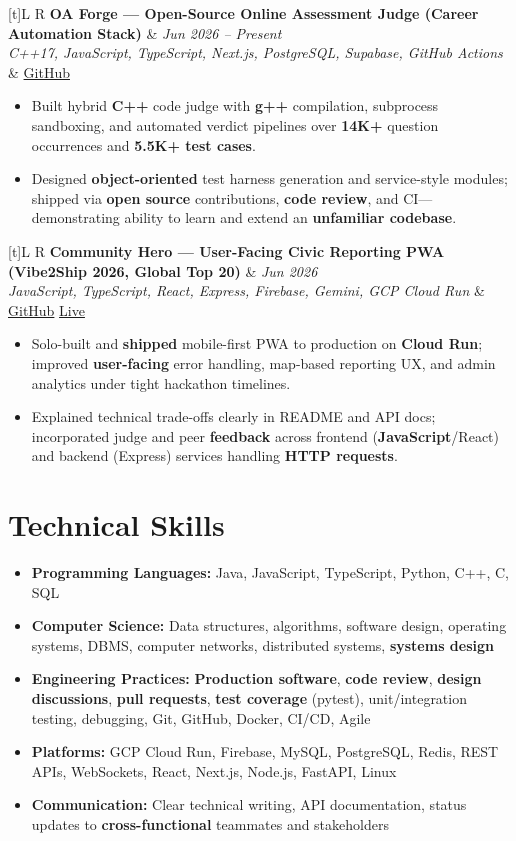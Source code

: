\documentclass[a4paper,10pt]{article}
\newcommand{\resumeProject}[4]{%
  \vspace{0.5mm}
  \noindent
  \begin{tabularx}{\textwidth}[t]{L R}
    \textbf{#1} & \textit{#3} \\
    \textit{#2} & #4 \\
  \end{tabularx}
  \vspace{-0.5mm}%
}
\begin{document}
\resumeProject
  {OA Forge --- Open-Source Online Assessment Judge (Career Automation Stack)}
  {C++17, JavaScript, TypeScript, Next.js, PostgreSQL, Supabase, GitHub Actions}
  {Jun 2026 -- Present}
  {\href{https://github.com/Ojas-Srivastava05/resume-optimiser}{GitHub}}
\begin{itemize}
  \item Built hybrid \textbf{C++} code judge with \textbf{g++} compilation, subprocess sandboxing, and automated verdict pipelines over \textbf{14K+} question occurrences and \textbf{5.5K+ test cases}.
  \item Designed \textbf{object-oriented} test harness generation and service-style modules; shipped via \textbf{open source} contributions, \textbf{code review}, and CI---demonstrating ability to learn and extend an \textbf{unfamiliar codebase}.
\end{itemize}

\resumeProject
  {Community Hero --- User-Facing Civic Reporting PWA (Vibe2Ship 2026, Global Top 20)}
  {JavaScript, TypeScript, React, Express, Firebase, Gemini, GCP Cloud Run}
  {Jun 2026}
  {\href{https://github.com/Ojas-Srivastava05/community-hero}{GitHub} \textbar{} \href{https://community-hero-987477089222.asia-south1.run.app}{Live}}
\begin{itemize}
  \item Solo-built and \textbf{shipped} mobile-first PWA to production on \textbf{Cloud Run}; improved \textbf{user-facing} error handling, map-based reporting UX, and admin analytics under tight hackathon timelines.
  \item Explained technical trade-offs clearly in README and API docs; incorporated judge and peer \textbf{feedback} across frontend (\textbf{JavaScript}/React) and backend (Express) services handling \textbf{HTTP requests}.
\end{itemize}

\section{Technical Skills}
\small
\begin{itemize}[label={}]
  \item \textbf{Programming Languages:} Java, JavaScript, TypeScript, Python, C++, C, SQL
  \item \textbf{Computer Science:} Data structures, algorithms, software design, operating systems, DBMS, computer networks, distributed systems, \textbf{systems design}
  \item \textbf{Engineering Practices:} \textbf{Production software}, \textbf{code review}, \textbf{design discussions}, \textbf{pull requests}, \textbf{test coverage} (pytest), unit/integration testing, debugging, Git, GitHub, Docker, CI/CD, Agile
  \item \textbf{Platforms:} GCP Cloud Run, Firebase, MySQL, PostgreSQL, Redis, REST APIs, WebSockets, React, Next.js, Node.js, FastAPI, Linux
  \item \textbf{Communication:} Clear technical writing, API documentation, status updates to \textbf{cross-functional} teammates and stakeholders
\end{itemize}
\end{document}
